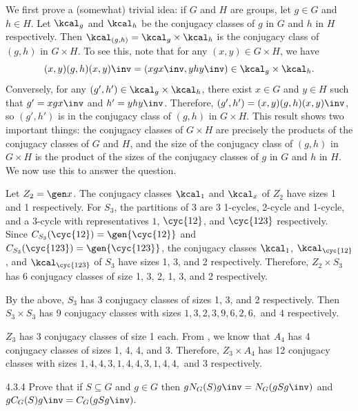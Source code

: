 \begin{sol}
	We first prove a (somewhat) trivial idea: if $G$ and $H$ are groups, let $g \in G$ and $h \in H$.
	Let $\kcal_g$ and $\kcal_h$ be the conjugacy classes of $g$ in $G$ and $h$ in $H$ respectively.
	Then $\kcal_{(g,h)} = \kcal_g \times \kcal_h$ is the conjugacy class of $(g,h)$ in $G \times H$.
	To see this, note that for any $(x,y) \in G \times H$, we have
	\[
		(x,y)(g,h)(x,y)\inv = (xgx\inv, yhy\inv) \in \kcal_g \times \kcal_h.
	\]
	Conversely, for any $(g', h') \in \kcal_g \times \kcal_h$, there exist $x \in G$ and $y \in H$ such that $g' = xgx\inv$ and $h' = yhy\inv$.
	Therefore, $(g', h') = (x,y)(g,h)(x,y)\inv$, so $(g', h')$ is in the conjugacy class of $(g,h)$ in $G \times H$.
	This result shows two important things: the conjugacy classes of $G \times H$ are precisely the products of the conjugacy classes of $G$ and $H$, and the size of the conjugacy class of $(g,h)$ in $G \times H$ is the product of the sizes of the conjugacy classes of $g$ in $G$ and $h$ in $H$.
	We now use this to answer the question.
	\begin{subexercises}
		\item Let $Z_2 = \gen x$.
		The conjugacy classes $\kcal_1$ and $\kcal_x$ of $Z_2$ have sizes 1 and 1 respectively.
		For $S_3$, the partitions of 3 are 3 1-cycles, 2-cycle and 1-cycle, and a 3-cycle with representatives $1$, $\cyc{1 2}$, and $\cyc{1 2 3}$ respectively.
		Since $C_{S_3}(\cyc{1 2}) = \gen{\cyc{1 2}}$ and $C_{S_3}(\cyc{1 2 3}) = \gen{\cyc{1 2 3}}$, the conjugacy classes $\kcal_1$, $\kcal_{\cyc{1 2}}$, and $\kcal_{\cyc{1 2 3}}$ of $S_3$ have sizes 1, 3, and 2 respectively.
		Therefore, $Z_2 \times S_3$ has 6 conjugacy classes of size 1, 3, 2, 1, 3, and 2 respectively.
		\item By the above, $S_3$ has 3 conjugacy classes of sizes 1, 3, and 2 respectively.
		Then $S_3 \times S_3$ has 9 conjugacy classes with sizes $1, 3, 2, 3, 9, 6, 2, 6,$ and $4$ respectively.
		\item $Z_3$ has 3 conjugacy classes of size 1 each.
		From , we know that $A_4$ has 4 conjugacy classes of sizes 1, 4, 4, and 3.
		Therefore, $Z_3 \times A_4$ has 12 conjugacy classes with sizes $1, 4, 4, 3, 1, 4, 4, 3, 1, 4, 4,$ and $3$ respectively. \qedhere
	\end{subexercises}
\end{sol}

\begin{exercise}{4.3.4}
	Prove that if $S \subseteq G$ and $g \in G$ then $gN_G(S)g\inv = N_G(gSg\inv)$ and $gC_G(S)g\inv = C_G(gSg\inv).$
\end{exercise}

